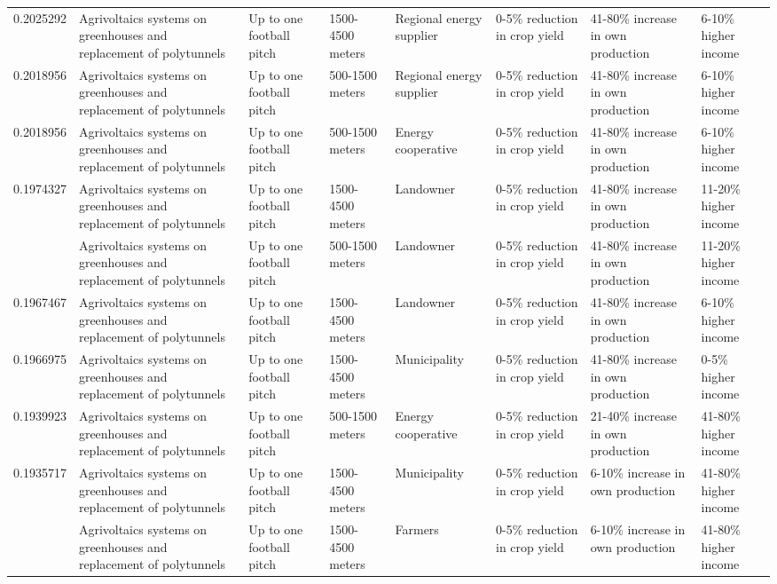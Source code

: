 \begin{table}
\begin{tabular}[t]{rlllllll}
0.2025292 & Agrivoltaics systems on greenhouses
and replacement of polytunnels & Up to one football pitch & 1500-4500 meters & Regional energy supplier & 0-5\% reduction in crop yield & 41-80\% increase in own production & 6-10\% higher income\\
0.2018956 & Agrivoltaics systems on greenhouses
and replacement of polytunnels & Up to one football pitch & 500-1500 meters & Regional energy supplier & 0-5\% reduction in crop yield & 41-80\% increase in own production & 6-10\% higher income\\
0.2018956 & Agrivoltaics systems on greenhouses
and replacement of polytunnels & Up to one football pitch & 500-1500 meters & Energy cooperative & 0-5\% reduction in crop yield & 41-80\% increase in own production & 6-10\% higher income\\
0.1974327 & Agrivoltaics systems on greenhouses
and replacement of polytunnels & Up to one football pitch & 1500-4500 meters & Landowner & 0-5\% reduction in crop yield & 41-80\% increase in own production & 11-20\% higher income\\
\addlinespace
0.1967991 & Agrivoltaics systems on greenhouses
and replacement of polytunnels & Up to one football pitch & 500-1500 meters & Landowner & 0-5\% reduction in crop yield & 41-80\% increase in own production & 11-20\% higher income\\
0.1967467 & Agrivoltaics systems on greenhouses
and replacement of polytunnels & Up to one football pitch & 1500-4500 meters & Landowner & 0-5\% reduction in crop yield & 41-80\% increase in own production & 6-10\% higher income\\
0.1966975 & Agrivoltaics systems on greenhouses
and replacement of polytunnels & Up to one football pitch & 1500-4500 meters & Municipality & 0-5\% reduction in crop yield & 41-80\% increase in own production & 0-5\% higher income\\
0.1939923 & Agrivoltaics systems on greenhouses
and replacement of polytunnels & Up to one football pitch & 500-1500 meters & Energy cooperative & 0-5\% reduction in crop yield & 21-40\% increase in own production & 41-80\% higher income\\
0.1935717 & Agrivoltaics systems on greenhouses
and replacement of polytunnels & Up to one football pitch & 1500-4500 meters & Municipality & 0-5\% reduction in crop yield & 6-10\% increase in own production & 41-80\% higher income\\
\addlinespace
0.1923561 & Agrivoltaics systems on greenhouses
and replacement of polytunnels & Up to one football pitch & 1500-4500 meters & Farmers & 0-5\% reduction in crop yield & 6-10\% increase in own production & 41-80\% higher income\\

\end{tabular}
\end{table}
